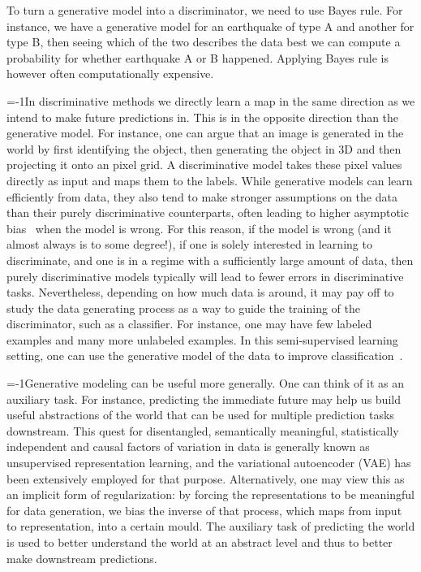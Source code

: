 \documentclass[MAL,biber]{nowfnt} %
\begin{document}
To turn a generative model into a discriminator, we need to use Bayes rule. For instance, we have a generative model for an earthquake of type A and another for type B, then seeing which of the two describes the data best we can compute a probability for whether earthquake A or B happened. Applying Bayes rule is however often computationally expensive. 

\looseness=-1In discriminative methods we directly learn a map in the same direction as we intend to make future predictions in. This is in the opposite direction than the generative model. For instance, one can argue that an image is generated in the world by first identifying the object, then generating the object in 3D and then projecting it onto an pixel grid. A discriminative model takes these pixel values directly as input and maps them to the labels. While generative models can learn efficiently from data, they also tend to make stronger assumptions on the data than their purely discriminative counterparts, often leading to higher asymptotic bias~\citep{banerjee2007analysis} when the model is wrong. For this reason, if the model is wrong (and it almost always is to some degree!), if one is solely interested in learning to discriminate, and one is in a regime with a sufficiently large amount of data, then purely discriminative models typically will lead to fewer errors in discriminative tasks. Nevertheless, depending on how much data is around, it may pay off to study the data generating process as a way to guide the training of the discriminator, such as a classifier. For instance, one may have few labeled examples and many more unlabeled examples. In this semi-supervised learning setting, one can use the generative model of the data to improve  classification~\citep{kingma2014semi,sonderby2016train}.

\looseness=-1Generative modeling can be useful more generally. One can think of it as an auxiliary task. For instance, predicting the immediate future may help us build useful  abstractions of the world that can be used for multiple prediction tasks downstream. This quest for disentangled, semantically meaningful, statistically independent and causal factors of variation in data is generally known as unsupervised representation learning, and the variational autoencoder (VAE) has been extensively employed for that purpose. Alternatively, one may view this as an implicit form of regularization: by forcing the representations to be meaningful for data generation, we bias the inverse of that process, which maps from input to representation, into a certain mould. The auxiliary task of predicting the world is used to better understand the world at an abstract level and thus to better make downstream predictions. 
\end{document}

